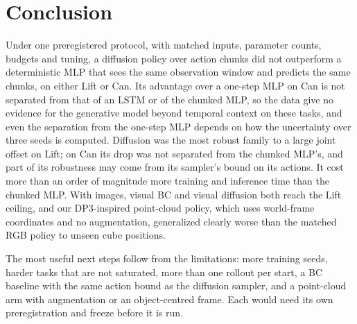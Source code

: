 \section{Conclusion}
\label{sec:conclusion}

Under one preregistered protocol, with matched inputs, parameter counts, budgets and tuning,
a diffusion policy over action chunks did not outperform a deterministic MLP that sees the
same observation window and predicts the same chunks, on either Lift or Can. Its advantage
over a one-step MLP on Can is not separated from that of an LSTM or of the chunked MLP, so
the data give no evidence for the generative model beyond temporal context on these tasks,
and even the separation from the one-step MLP depends on how the uncertainty over three seeds
is computed. Diffusion was the most robust family to a large joint offset on Lift; on Can its
drop was not separated from the chunked MLP's, and part of its robustness may come from its
sampler's bound on its actions. It cost more than an order of
magnitude more training and inference time than the chunked MLP. With images, visual BC and
visual diffusion both reach the Lift ceiling, and our DP3-inspired point-cloud policy, which
uses world-frame coordinates and no augmentation, generalized clearly worse than the matched
RGB policy to unseen cube positions.

The most useful next steps follow from the limitations: more training seeds, harder tasks
that are not saturated, more than one rollout per start, a BC baseline with the same action
bound as the diffusion sampler, and a point-cloud arm with augmentation or an object-centred
frame. Each would need its own preregistration and freeze before it is run.
